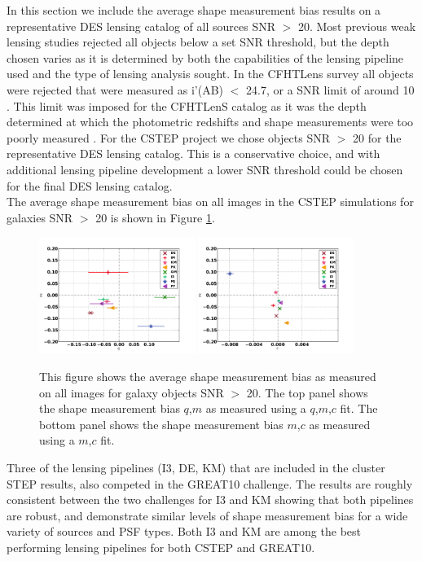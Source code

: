 In this section we include the average shape measurement 
bias results on a representative DES lensing catalog of 
all sources SNR $>$ 20. Most previous weak lensing studies 
rejected all objects below a set SNR threshold, but the 
depth chosen varies as it is determined by both the capabilities 
of the lensing pipeline used and the type of lensing analysis sought. In 
the CFHTLens survey all objects were rejected that were
measured as i'(AB) $<$ 24.7, or a SNR limit of around 10
\citep{cfhtls}. This limit was imposed for the CFHTLenS
catalog as it was the depth determined at which the 
photometric redshifts and shape measurements were too
poorly measured \citep{Hild}. For the CSTEP project
we chose objects SNR $>$ 20 for the representative DES 
lensing catalog. This is a conservative choice, and 
with additional lensing pipeline development a lower
SNR threshold could be chosen for the final DES 
lensing catalog. \\
\indent The average shape measurement bias on all images 
in the CSTEP simulations for galaxies SNR $>$ 20
is shown in Figure \ref{fig:QMC}. 
\begin{figure}
 \centering  %
  \includegraphics[width=0.45\textwidth]{fig/QMC_main_f.pdf} 
  \includegraphics[width=0.45\textwidth]{fig/MC_main_f.pdf} 
  \caption{This figure shows the average shape measurement bias
as measured on all images for galaxy objects SNR $>$ 20. The
top panel shows the shape measurement bias $q$,$m$ as measured using 
a $q$,$m$,$c$ fit. The bottom panel shows the shape measurement bias 
$m$,$c$ as measured using a $m$,$c$ fit.}
\label{fig:QMC}
\end{figure}
Three of the lensing pipelines (I3, DE, KM) that are included in the
cluster STEP results, also competed in the GREAT10 challenge.
The results are roughly consistent between
the two challenges for I3 and KM showing that both pipelines are 
robust, and demonstrate similar levels of shape measurement bias
for a wide variety of sources and PSF types. Both I3 and KM are 
among the best performing lensing pipelines for both CSTEP and
GREAT10. 

